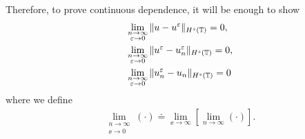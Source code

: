 Therefore, to prove continuous dependence, it will be enough to show 
\begin{align}
	& \lim_{\substack{n\to \infty \\ \varepsilon \to 0}} \|u - u^\varepsilon\|_{H^s(\mathbb{T})}
	=0,
	\label{enough_to_prove1}
	\\
	& \lim_{\substack{n\to \infty \\ \varepsilon \to 0}} \|u^\varepsilon - u^{\varepsilon}_n
	\|_{H^s(\mathbb{T})} = 0,
	\label{enough_to_prove2}
	\\
	& \lim_{\substack{n\to \infty \\ \varepsilon \to 0}}
	\|u^{\varepsilon}_n - u_n \|_{H^s(\mathbb{T})} =0
	\label{enough_to_prove3}
\end{align}
where we define 
\medskip
	\begin{equation}
		\label{lim-not}
		\begin{split}
			\lim_{\substack{n\to \infty \\ \ee \to 0}} (\cdot) \doteq \lim_{\ee \to
			\infty} [\lim_{n \to \infty} (\cdot )].
		\end{split}
	\end{equation}
